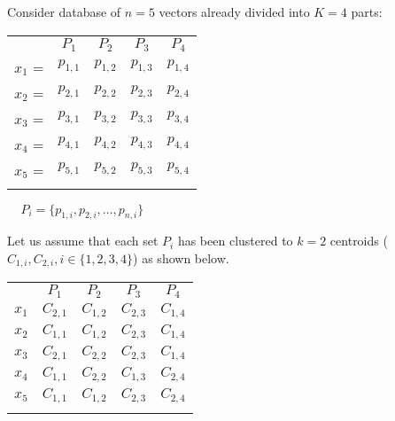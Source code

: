 \par
Consider database of $n = 5$ vectors already divided into $K = 4$ parts:
\begin{center}
\renewcommand{\arraystretch}{1.2}
\begin{tabular}{c|c|c|c|c|}
\multicolumn{1}{r}{} & \multicolumn{1}{c}{$P_{1}$} & \multicolumn{1}{c}{$P_{2}$}
& \multicolumn{1}{c}{$P_{3}$} & \multicolumn{1}{c}{$P_{4}$} \\
\hhline{~----}
$x_1$ = & $p_{1,1}$ & $p_{1,2}$ & $p_{1,3}$ & $p_{1,4}$ \\
\hhline{~----}
$x_2$ = & $p_{2,1}$ & $p_{2,2}$ & $p_{2,3}$ & $p_{2,4}$ \\
\hhline{~----}
$x_3$ = & $p_{3,1}$ & $p_{3,2}$ & $p_{3,3}$ & $p_{3,4}$ \\
\hhline{~----}
$x_4$ = & $p_{4,1}$ & $p_{4,2}$ & $p_{4,3}$ & $p_{4,4}$ \\
\hhline{~----}
$x_5$ = & $p_{5,1}$ & $p_{5,2}$ & $p_{5,3}$ & $p_{5,4}$ \\
\hhline{~----}
\end{tabular}
$\ \ \ \ \ P_i = \{ p_{1,i}, p_{2,i}, \ldots, p_{n,i} \}$ \\
\end{center}

\smallskip

Let us assume that each set $P_i$ has been clustered to $k=2$ centroids
($C_{1,i}, C_{2,i}, i \in \{1,2,3,4\}$) as shown below.
\begin{center}
\renewcommand{\arraystretch}{1.2}
\begin{tabular}{c|c|c|c|c|}
\multicolumn{1}{r}{} & \multicolumn{1}{c}{$P_{1}$} & \multicolumn{1}{c}{$P_{2}$}
& \multicolumn{1}{c}{$P_{3}$} & \multicolumn{1}{c}{$P_{4}$} \\
\hhline{~----}
$x_1$ & $C_{2,1}$ & $C_{1,2}$ & $C_{2,3}$ & $C_{1,4}$ \\
\hhline{~----}
$x_2$ & $C_{1,1}$ & $C_{1,2}$ & $C_{2,3}$ & $C_{1,4}$ \\
\hhline{~----}
$x_3$ & $C_{2,1}$ & $C_{2,2}$ & $C_{2,3}$ & $C_{1,4}$ \\
\hhline{~----}
$x_4$ & $C_{1,1}$ & $C_{2,2}$ & $C_{1,3}$ & $C_{2,4}$ \\
\hhline{~----}
$x_5$ & $C_{1,1}$ & $C_{1,2}$ & $C_{2,3}$ & $C_{2,4}$ \\
\hhline{~----}
\end{tabular}
\end{center}

\smallskip

